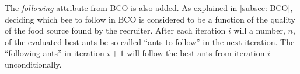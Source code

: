 The \textit{following} attribute from BCO is also added. As explained in \vref{subsec: BCO}, deciding which bee to follow in BCO is considered to be a function of the quality of the food source found by the recruiter. After each iteration $i$ will a number, $n$, of the evaluated best ants be so-called ``ants to follow'' in the next iteration. The ``following ants'' in iteration $i+1$ will follow the best ants from iteration $i$ unconditionally. 





